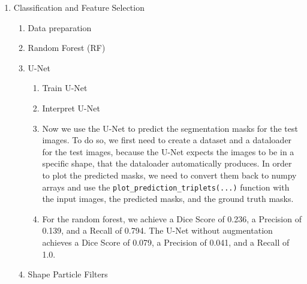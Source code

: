 \documentclass[
    a4paper,
    12pt,
    parskip=half,
]{scrarticle}
\begin{document}
\begin{enumerate}
    \item Classification and Feature Selection
    \begin{enumerate}[label=\theenumi.\arabic*.]
        \item Data preparation
        \item Random Forest (RF)
        \item U-Net
        \begin{enumerate}[label=\alph*)]
            \item Train U-Net
            \item Interpret U-Net
            \item Now we use the U-Net to predict the segmentation masks for the test images.
            To do so, we first need to create a dataset and a dataloader for the test images, because the U-Net expects the images to be in a specific shape, that the dataloader automatically produces.
            In order to plot the predicted masks, we need to convert them back to numpy arrays and use the \texttt{plot\_prediction\_triplets(...)} function with the input images, the predicted masks, and the ground truth masks.
            \item For the random forest, we achieve a Dice Score of 0.236, a Precision of 0.139, and a Recall of 0.794.
            The U-Net without augmentation achieves a Dice Score of 0.079, a Precision of 0.041, and a Recall of 1.0.
        \end{enumerate}
        \item Shape Particle Filters
    \end{enumerate}
\end{enumerate}
\end{document}
